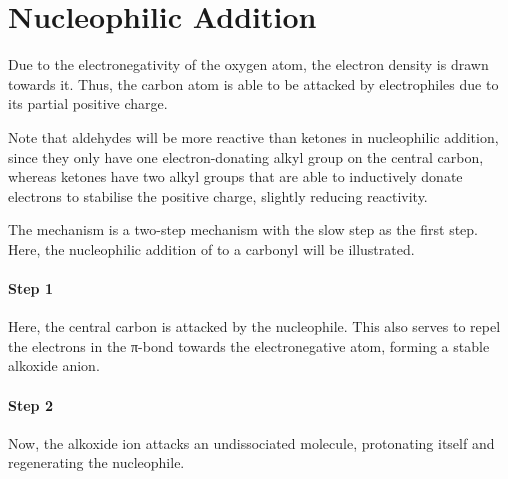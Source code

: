 	\pagebreak
	\hypertarget{AppendixNucleophilicAddition}{}
	\section{Nucleophilic Addition}

		Due to the electronegativity of the oxygen atom, the electron density is drawn towards it. Thus, the carbon atom is able
		to be attacked by electrophiles due to its partial positive charge.

		Note that aldehydes will be more reactive than ketones in nucleophilic addition, since they only have one electron-donating
		alkyl group on the central carbon, whereas ketones have two alkyl groups that are able to inductively donate electrons to
		stabilise the positive charge, slightly reducing reactivity.

		The mechanism is a two-step mechanism with the slow step as the first step. Here, the nucleophilic addition of  to
		a carbonyl will be illustrated.

		\paragraph{Step 1}

		Here, the central carbon is attacked by the nucleophile. This also serves to repel the electrons in the π-bond towards the
		electronegative  atom, forming a stable alkoxide anion.



		\paragraph{Step 2}

		Now, the alkoxide ion attacks an undissociated  molecule, protonating itself and regenerating the  nucleophile.

